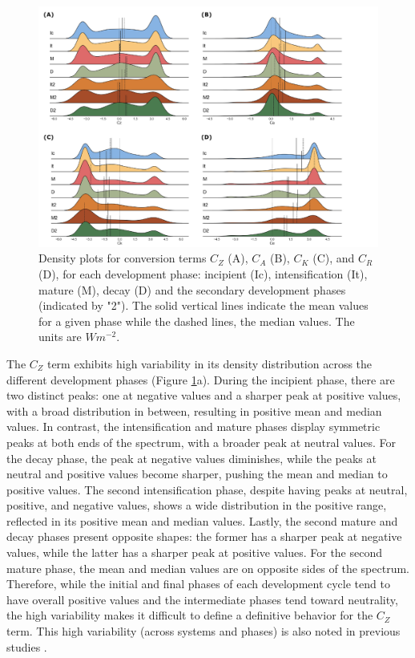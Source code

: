 \begin{figure}[!htbp]
\centering
\includegraphics[width=\textwidth]{figs_5/ridge_plot_Conversion Terms.pdf}
\caption[Density Plots - Energy Terms]{Density plots for conversion terms $C_Z$ (A), $C_A$ (B), $C_K$ (C), and $C_R$ (D), for each development phase: incipient (Ic), intensification (It), mature (M), decay (D) and the secondary development phases (indicated by "2"). The solid vertical lines indicate the mean values for a given phase while the dashed lines, the median values. The units are $W m^{-2}$.}
\label{fig:ridge_plot_Conversion}
\end{figure}

The $C_Z$ term exhibits high variability in its density distribution across the different development phases (Figure \ref{fig:ridge_plot_Conversion}a). During the incipient phase, there are two distinct peaks: one at negative values and a sharper peak at positive values, with a broad distribution in between, resulting in positive mean and median values. In contrast, the intensification and mature phases display symmetric peaks at both ends of the spectrum, with a broader peak at neutral values. For the decay phase, the peak at negative values diminishes, while the peaks at neutral and positive values become sharper, pushing the mean and median to positive values. The second intensification phase, despite having peaks at neutral, positive, and negative values, shows a wide distribution in the positive range, reflected in its positive mean and median values. Lastly, the second mature and decay phases present opposite shapes: the former has a sharper peak at negative values, while the latter has a sharper peak at positive values. For the second mature phase, the mean and median values are on opposite sides of the spectrum. Therefore, while the initial and final phases of each development cycle tend to have overall positive values and the intermediate phases tend toward neutrality, the high variability makes it difficult to define a definitive behavior for the $C_Z$ term. This high variability (across systems and phases) is also noted in previous studies \citep[e.g.]{michaelides1987limited,veiga2008analysis,dias2011energy,dias2013synoptic}.

